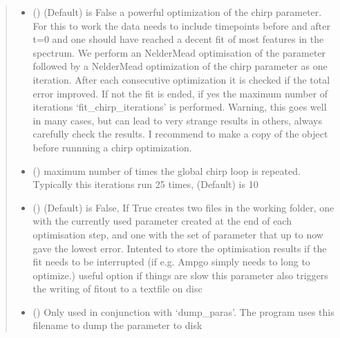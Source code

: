 \documentclass[letterpaper,10pt,english]{sphinxmanual}
\begin{document}
\begin{fulllineitems}
\begin{fulllineitems}
\begin{quote}
\begin{description}
\begin{itemize}
\item {} 
 (\sphinxstyleliteralemphasis{\sphinxupquote{, }}) \textendash{} (Default) is False
a powerful optimization of the chirp parameter. For this to work the data
needs to include timepoints before and after t=0 and one should have reached
a decent fit of most features in the spectrum. We perform an Nelder\sphinxhyphen{}Mead optimisation
of the parameter followed by a Nelder\sphinxhyphen{}Mead optimization of the chirp parameter
as one iteration. After each consecutive optimization it is checked if the total error
improved. If not the fit is ended, if yes the maximum number of iterations
‘fit\_chirp\_iterations’ is performed. Warning, this goes well in many cases,
but can lead to very strange results in others, always carefully check the results.
I recommend to make a copy of the object before runnning a chirp optimization.

\item {} 
 (\sphinxstyleliteralemphasis{\sphinxupquote{, }}) \textendash{} maximum number of times the global \sphinxhyphen{} chirp loop is repeated.
Typically this iterations run 2\sphinxhyphen{}5 times, (Default) is 10

\item {} 
 (\sphinxstyleliteralemphasis{\sphinxupquote{, }}) \textendash{} (Default) is False, If True creates two files in the working folder, one with the
currently used parameter created at the end of each optimisation step, and one with
the set of parameter that up to now gave the lowest error. Intented to store
the optimisation results if the fit needs to be interrupted
(if e.g. Ampgo simply needs to long to optimize.) useful option if things are slow
this parameter also triggers the writing of fitout to a textfile on disc

\item {} 
 (\sphinxstyleliteralemphasis{\sphinxupquote{, }}) \textendash{} Only used in conjunction with ‘dump\_paras’. The program uses this filename to dump the
parameter to disk


\end{itemize}
\end{description}
\end{quote}
\end{fulllineitems}
\end{fulllineitems}
\end{document}
